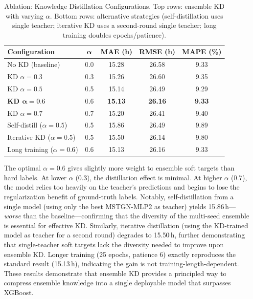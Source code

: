 \documentclass[conference]{IEEEtran}
\begin{document}
\begin{table}[t]
    \centering
    \caption{Ablation: Knowledge Distillation Configurations. Top rows: ensemble KD with varying $\alpha$. Bottom rows: alternative strategies (self-distillation uses single teacher; iterative KD uses a second-round single teacher; long training doubles epochs/patience).}
    \label{tab:kd_ablation}
    \begin{tabular}{lcccc}
        \toprule
        \textbf{Configuration} & $\boldsymbol{\alpha}$ & \textbf{MAE (h)} & \textbf{RMSE (h)} & \textbf{MAPE (\%)} \\
        \midrule
        No KD (baseline)  & 0.0 & 15.28 & 26.58 & 9.33 \\
        KD $\alpha{=}0.3$ & 0.3 & 15.26 & 26.60 & 9.35 \\
        KD $\alpha{=}0.5$ & 0.5 & 15.14 & 26.49 & 9.29 \\
        \textbf{KD $\boldsymbol{\alpha{=}0.6}$} & 0.6 & \textbf{15.13} & \textbf{26.16} & \textbf{9.33} \\
        KD $\alpha{=}0.7$ & 0.7 & 15.20 & 26.41 & 9.40 \\
        \midrule
        Self-distill ($\alpha{=}0.5$) & 0.5 & 15.86 & 26.49 & 9.89 \\
        Iterative KD ($\alpha{=}0.5$) & 0.5 & 15.50 & 26.14 & 9.80 \\
        Long training ($\alpha{=}0.6$) & 0.6 & 15.13 & 26.16 & 9.33 \\
        \bottomrule
    \end{tabular}
\end{table}

The optimal $\alpha = 0.6$ gives slightly more weight to ensemble soft targets than hard labels.
At lower $\alpha$ (0.3), the distillation effect is minimal.
At higher $\alpha$ (0.7), the model relies too heavily on the teacher's predictions and begins to lose the regularization benefit of ground-truth labels.
Notably, self-distillation from a single model (using only the best MSTGN-MLP2 as teacher) yields 15.86\,h---\textit{worse} than the baseline---confirming that the diversity of the multi-seed ensemble is essential for effective KD.
Similarly, iterative distillation (using the KD-trained model as teacher for a second round) degrades to 15.50\,h, further demonstrating that single-teacher soft targets lack the diversity needed to improve upon ensemble KD.
Longer training (25 epochs, patience 6) exactly reproduces the standard result (15.13\,h), indicating the gain is not training-length-dependent.
These results demonstrate that ensemble KD provides a principled way to compress ensemble knowledge into a single deployable model that surpasses XGBoost.
\end{document}
